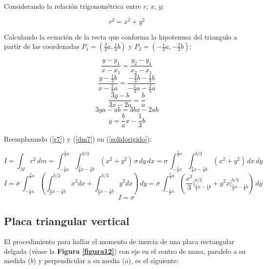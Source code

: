 Considerando la relación trigonométrica entre $r$, $x$, $y$:

\begin{equation}
    r^2 = x^2 + y^2
\label{r7}
\end{equation}

Calculando la ecuación de la recta que conforma la hipotenusa del triangulo a
partir de las coordenadas $P_1 = (\frac{2}{3} a, \frac{1}{3} b)$ y
$P_2 = (- \frac{1}{3} a, - \frac{2}{3} b)$:

\begin{equation*}
    \frac{y - y_1}{x - x_1} = \frac{y_2 - y_1}{x_2 - x_1}
\end{equation*}
\begin{equation*}
    \frac{y - \frac{1}{3} b}{x - \frac{2}{3} a} = \frac{- \frac{2}{3} b - \frac{1}{3} b}{- \frac{1}{3} a - \frac{2}{3} a}
\end{equation*}
\begin{equation*}
    \frac{3y - b}{3x - 2a} = \frac{b}{a}
\end{equation*}
\begin{equation*}
    3ya - ab = 3bx - 2ab
\end{equation*}
\begin{equation*}
    y = \frac{b}{a} x - \frac{1}{3} b
\end{equation*}

Reemplazando (\ref{r7}) y (\ref{dm7}) en (\ref{solidorigido}):

\begin{equation*}
    I = \int_{M} r^2\, dm = \int_{-\frac{1}{3} a}^{\frac{2}{3} a} \int_{\frac{b}{a} x - \frac{1}{3} b}^{b/3} (x^2 + y^2)\, \sigma\, dy\, dx = \sigma\, \int_{-\frac{1}{3} a}^{\frac{2}{3} a} \int_{\frac{b}{a} x - \frac{1}{3} b}^{b/3} (x^2 + y^2)\, dx \, dy
\end{equation*}
\begin{equation*}
    I = \sigma\, \int_{-\frac{1}{3} a}^{\frac{2}{3} a} \left( \int_{\frac{b}{a} x - \frac{1}{3} b}^{b/3} x^2 dx + \int_{\frac{b}{a} x - \frac{1}{3} b}^{b/3} y^2 dx \right) \, dy = \sigma\, \int_{-\frac{1}{3} a}^{\frac{2}{3} a} \left( \frac{x^3}{3} \Biggr|_{\frac{b}{a} x - \frac{1}{3} b}^{b/3} + y^2 x \Biggr|_{\frac{b}{a} x - \frac{1}{3} b}^{b/3} \right) \, dy
\end{equation*}
\begin{equation*}
    I = \sigma\,
\end{equation*}

\subsection{Placa triangular vertical}
El procedimiento para hallar el momento de inercia de una placa rectangular
delgada (véase la \textbf{Figura \ref{figura12}}) con eje en el centro de masa,
paralelo a su medida ($b$) y perpendicular a su media ($a$), es el siguiente:

